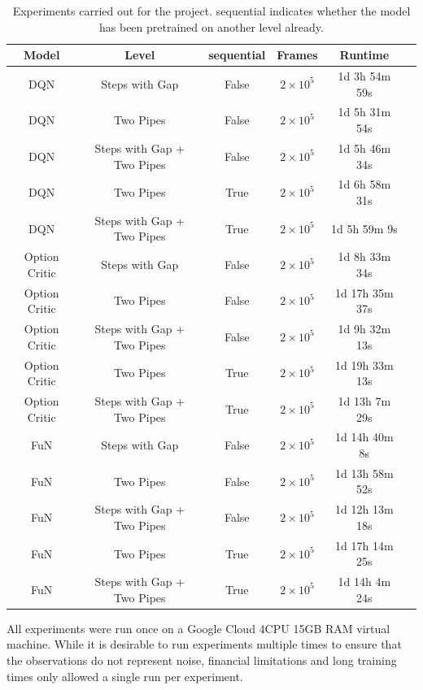 \documentclass[notitlepage,a4paper,11pt]{article}
\begin{document}
\begin{table}[h!]
\centering
\begin{tabular}{ |c|c|c|c|c|c| } 
 \hline
 \textbf{Model} & \textbf{Level} & \textbf{sequential} & \textbf{Frames} & \textbf{Runtime}\\
 \hline 
 DQN & Steps with Gap & False & $2 \times 10^5$ & 1d 3h 54m 59s\\ 
 \hline
 DQN & Two Pipes & False & $2 \times 10^5$ & 1d 5h 31m 54s\\ 
 \hline
 DQN & Steps with Gap + Two Pipes & False & $2 \times 10^5$ & 1d 5h 46m 34s \\ 
 \hline
DQN & Two Pipes & True & $2 \times 10^5$ & 1d 6h 58m 31s\\ 
 \hline
 DQN & Steps with Gap + Two Pipes & True & $2 \times 10^5$ & 1d 5h 59m 9s\\ 
 \hline 
 Option Critic & Steps with Gap & False & $2 \times 10^5$ & 1d 8h 33m 34s\\ 
 \hline
 Option Critic & Two Pipes & False & $2 \times 10^5$ & 1d 17h 35m 37s\\ 
 \hline
 Option Critic & Steps with Gap + Two Pipes & False & $2 \times 10^5$ & 1d 9h 32m 13s\\ 
 \hline
Option Critic & Two Pipes & True & $2 \times 10^5$ & 1d 19h 33m 13s\\ 
 \hline
 Option Critic & Steps with Gap + Two Pipes & True & $2 \times 10^5$ & 1d 13h 7m 29s\\ 
 \hline
 
  FuN & Steps with Gap & False & $2 \times 10^5$ & 1d 14h 40m 8s\\ 
 \hline
 FuN & Two Pipes & False & $2 \times 10^5$ & 1d 13h 58m 52s\\ 
 \hline
 FuN & Steps with Gap + Two Pipes & False & $2 \times 10^5$ & 1d 12h 13m 18s\\ 
 \hline
FuN & Two Pipes & True & $2 \times 10^5$ & 1d 17h 14m 25s\\ 
 \hline
 FuN & Steps with Gap + Two Pipes & True & $2 \times 10^5$ & 1d 14h 4m 24s\\ 
 \hline
 
\end{tabular}
\caption{Experiments carried out for the project. sequential indicates whether the model has been pretrained on another level already.}
\label{tbl:experiments}
\end{table}

All experiments were run once on a Google Cloud 4CPU 15GB RAM virtual machine. While it is desirable to run experiments multiple times to ensure that the observations do not represent noise, financial limitations and long training times only allowed a single run per experiment. 
\end{document}
